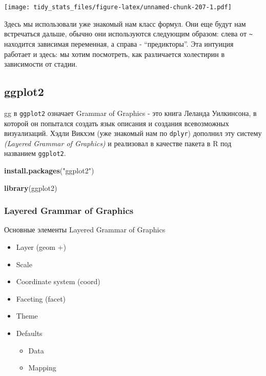 \documentclass[]{book}
\newenvironment{Shaded}{\begin{snugshade}}{\end{snugshade}}
\newcommand{\KeywordTok}[1]{\textcolor[rgb]{0.13,0.29,0.53}{\textbf{#1}}}
\newcommand{\StringTok}[1]{\textcolor[rgb]{0.31,0.60,0.02}{#1}}
\newcommand{\NormalTok}[1]{#1}
\providecommand{\tightlist}{%
  \setlength{\itemsep}{0pt}\setlength{\parskip}{0pt}}
\begin{document}
\texttt{[image: tidy\_stats\_files/figure-latex/unnamed-chunk-207-1.pdf]}

Здесь мы использовали уже знакомый нам класс формул. Они еще будут нам
встречаться дальше, обычно они используются следующим образом: слева от
\texttt{\textasciitilde{}} находится зависимая переменная, а справа -
``предикторы''. Эта интуиция работает и здесь: мы хотим посмотреть, как
различается холестирин в зависимости от стадии.

\subsection{ggplot2}\label{ggplot2}

gg в \texttt{ggplot2} означает Grammar of Graphics - это книга Леланда
Уилкинсона, в которой он попытался создать язык описания и создания
всевозможных визуализаций. Хэдли Викхэм (уже знакомый нам по
\texttt{dplyr}) дополнил эту систему \emph{(Layered Grammar of
Graphics)} и реализовал в качестве пакета в R под названием
\texttt{ggplot2}.

\begin{Shaded}
\begin{Highlighting}[]
\KeywordTok{install.packages}\NormalTok{(}\StringTok{"ggplot2"}\NormalTok{)}
\end{Highlighting}
\end{Shaded}

\begin{Shaded}
\begin{Highlighting}[]
\KeywordTok{library}\NormalTok{(ggplot2)}
\end{Highlighting}
\end{Shaded}

\subsubsection{Layered Grammar of
Graphics}\label{layered-grammar-of-graphics}

Основные элементы Layered Grammar of Graphics

\begin{itemize}
\tightlist
\item
  Layer (geom +)
\item
  Scale
\item
  Coordinate system (coord)
\item
  Faceting (facet)
\item
  Theme
\item
  Defaults

  \begin{itemize}
  \tightlist
  \item
    Data
  \item
    Mapping
  \end{itemize}
\end{itemize}
\end{document}
